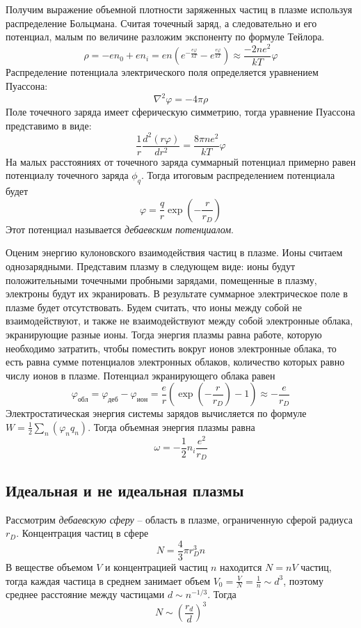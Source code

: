 Получим выражение объемной плотности заряженных частиц в плазме используя распределение Больцмана. Считая точечный заряд, а следовательно и его потенциал, малым по величине разложим экспоненту по формуле Тейлора.
$$\rho = -e n_0 + e n_i = en \left( e^{-\frac{e\varphi}{kT}} - e^{\frac{e \varphi}{kT}} \right) \approx \frac{-2 ne^2}{kT} \varphi$$
Распределение потенциала электрического поля определяется уравнением Пуассона:
$$
\nabla^2 \varphi = - 4 \pi \rho
$$
Поле точечного заряда имеет сферическую симметрию, тогда уравнение Пуассона представимо в виде:
$$
\frac{1}{r}\frac{d^2(r \varphi)}{d r^2} = \frac{8 \pi n e^2}{kT} \varphi
$$
На малых расстояниях от точечного заряда суммарный потенциал примерно равен потенциалу точечного заряда $\phi_q$. Тогда итоговым распределением потенциала будет
$$
\varphi = \frac{q}{r} \exp \left( -\frac{r}{r_D} \right)
$$
Этот потенциал называется \textit{дебаевским потенциалом}.

Оценим энергию кулоновского взаимодействия частиц в плазме. Ионы считаем однозарядными. Представим плазму в следующем виде: ионы будут положительными точечными пробными зарядами, помещенные в плазму, электроны будут их экранировать. В результате суммарное электрическое поле в плазме будет отсутствовать. Будем считать, что ионы между собой не взаимодействуют, и также не взаимодействуют между собой электронные облака, экранирующие разные ионы. Тогда энергия плазмы равна работе, которую необходимо затратить, чтобы поместить вокруг ионов электронные облака, то есть равна сумме потенциалов электронных облаков, количество которых равно числу ионов в плазме. Потенциал экранирующего облака равен
$$
\varphi_{обл} = \varphi_{деб} - \varphi_{ион} = \frac{e}{r} \left(\exp \left( -\frac{r}{r_D} \right) - 1\right) \approx - \frac{e}{r_D}
$$
Электростатическая энергия системы зарядов вычисляется по формуле $W = \frac{1}{2} \sum_n (\varphi_n q_n)$. Тогда объемная энергия плазмы равна
$$
\omega = - \frac{1}{2} n_i \frac{e^2}{r_D}
$$

\subsection*{Идеальная и не идеальная плазмы}

Рассмотрим \textit{дебаевскую сферу} -- область в плазме, ограниченную сферой радиуса $r_D$. Концентрация частиц в сфере
$$
N = \frac{4}{3} \pi r_D^3 n
$$
В веществе объемом $V$ и концентрацией частиц $n$ находится $N = nV$ частиц, тогда каждая частица в среднем занимает объем $V_0 = \frac{V}{N} = \frac{1}{n} \sim d^3$, поэтому среднее расстояние между частицами $d \sim n^{-1/3}$. Тогда 
$$N \sim \left( \frac{r_d}{d} \right)^3$$

